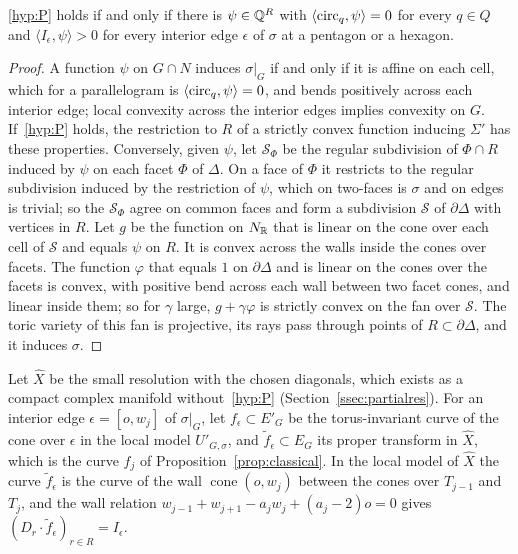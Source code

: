 \begin{lemma}\label{lem:projLP}
\ref{hyp:P} holds if and only if there is $\psi\in\mathbb Q^R$ with $\langle\mathrm{circ}_q,\psi\rangle=0$ for every $q\in Q$ and $\langle I_\epsilon,\psi\rangle>0$ for every
interior edge $\epsilon$ of $\sigma$ at a pentagon or a hexagon.
\end{lemma}

\begin{proof}
A function $\psi$ on $G\cap N$ induces $\sigma|_G$ if and only if it is affine on each cell, which for a parallelogram is $\langle\mathrm{circ}_q,\psi\rangle=0$,
and bends positively across each interior edge; local convexity across the interior edges implies convexity on $G$. If~\ref{hyp:P} holds, the
restriction to $R$ of a strictly convex function inducing $\Sigma'$ has these properties. Conversely, given $\psi$, let $\mathcal S_\Phi$ be the
regular subdivision of $\Phi\cap R$ induced by $\psi$ on each facet $\Phi$ of $\Delta$. On a face of $\Phi$ it restricts to the regular subdivision
induced by the restriction of $\psi$, which on two-faces is $\sigma$ and on edges is trivial; so the $\mathcal S_\Phi$ agree on common faces and form a
subdivision $\mathcal S$ of $\partial\Delta$ with vertices in $R$. Let $g$ be the function on $N_\mathbb R$ that is linear on the cone over each cell of
$\mathcal S$ and equals $\psi$ on $R$. It is convex across the walls inside the cones over facets. The function $\varphi$ that equals $1$ on
$\partial\Delta$ and is linear on the cones over the facets is convex, with positive bend across each wall between two facet cones, and linear
inside them; so for $\gamma$ large, $g+\gamma\varphi$ is strictly convex on the fan over $\mathcal S$. The toric variety of this fan is projective, its rays pass
through points of $R\subset\partial\Delta$, and it induces $\sigma$.
\end{proof}

Let $\widehat X$ be the small resolution with the chosen diagonals, which exists as a compact complex manifold without~\ref{hyp:P}
(Section~\ref{ssec:partialres}). For an interior edge $\epsilon=[o,w_j]$ of $\sigma|_G$, let $f_\epsilon\subset E'_G$ be the torus-invariant curve of
the cone over $\epsilon$ in the local model $U'_{G,\sigma}$, and $\tilde f_\epsilon\subset E_G$ its proper transform in $\widehat X$, which is the
curve $f_j$ of Proposition~\ref{prop:classical}. In the local model of $\widehat X$ the curve $\tilde f_\epsilon$ is the curve of the wall
$\operatorname{cone}(o,w_j)$ between the cones over $T_{j-1}$ and $T_j$, and the wall relation
$w_{j-1}+w_{j+1}-a_jw_j+(a_j-2)o=0$ gives $(D_r\cdot\tilde f_\epsilon)_{r\in R}=I_\epsilon$.

